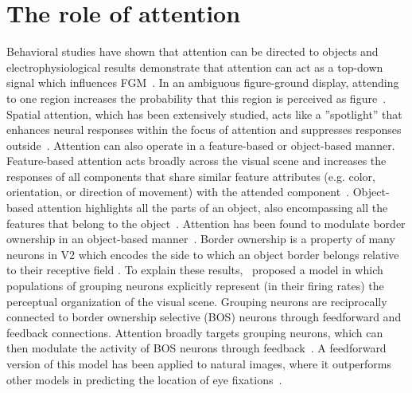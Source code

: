 \section{The role of attention}
Behavioral studies have shown that attention can be directed to objects \citep{Egly_etal94} and electrophysiological results demonstrate that attention can act as a top-down signal which influences FGM~\citep{Qiu_etal07,  Poort_etal12}. In an ambiguous figure-ground display, attending to one region increases the probability that this region is perceived as figure~\citep{Driver_Baylis96, Vecera_etal04}. Spatial attention, which has been extensively studied, acts like a ''spotlight'' that enhances neural responses within the focus of attention and suppresses responses outside~\citep{Motter93}. Attention can also operate in a feature-based or object-based manner. Feature-based attention acts broadly across the visual scene and increases the responses of all components that share similar feature attributes (e.g. color, orientation, or direction of movement) with the attended component~\citep{Treue_Trujillo99}. Object-based attention highlights all the parts of an object, also encompassing all the features that belong to the object~\citep{Roelfsema_etal98, Schoenfeld_etal14}.
Attention has been found to modulate border ownership in an object-based manner~\citep{Qiu_etal07}. Border ownership is a property of many neurons in V2 which encodes the side to which an object border
belongs relative to their receptive field \citep{Zhou_etal00}. To explain these results,~\cite{Craft_etal07} proposed a model in which populations of grouping neurons explicitly represent (in their firing rates) the perceptual organization of the visual scene. Grouping neurons are reciprocally connected to border ownership selective (BOS) neurons through feedforward and feedback connections. Attention broadly
targets grouping neurons, which can then modulate the activity of BOS
neurons through feedback~\citep{Mihalas_etal11b}. A feedforward version of this model has been applied to natural images, where it outperforms other models in predicting the location of eye
fixations~\citep{Russell_etal14}.

